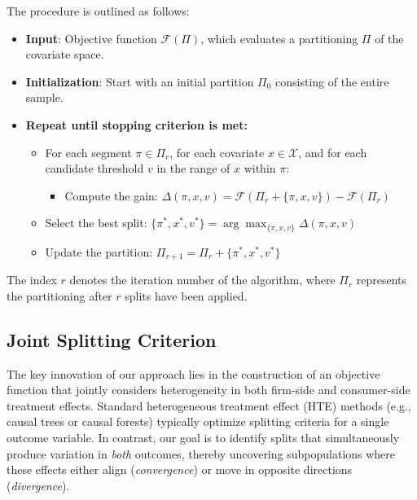 \documentclass[11pt,letterpaper,english]{article}
\theoremstyle{definition}
\theoremstyle{definition}
\begin{document}
\begin{bibunit}
The procedure is outlined as follows:

\begin{itemize}
    \item \textbf{Input}: Objective function $\mathcal{F}(\Pi)$, which evaluates a partitioning $\Pi$ of the covariate space.
    \item \textbf{Initialization}: Start with an initial partition $\Pi_0$ consisting of the entire sample.
    \item \textbf{Repeat until stopping criterion is met:}
    \begin{itemize}
        \item For each segment $\pi \in \Pi_r$, for each covariate $x \in \mathcal{X}$, and for each candidate threshold $v$ in the range of $x$ within $\pi$:
        \begin{itemize}[label={}]
            \item Compute the gain: \quad $\Delta(\pi, x, v) = \mathcal{F}(\Pi_r + \{\pi, x, v\}) - \mathcal{F}(\Pi_r)$
        \end{itemize}
        \item Select the best split: \quad $\{\pi^*, x^*, v^*\} = \arg\max_{\{\pi,x,v\}} \Delta(\pi, x, v)$
        \item Update the partition: \quad $\Pi_{r+1} = \Pi_r + \{\pi^*, x^*, v^*\}$
    \end{itemize}
\end{itemize}

The index \( r \) denotes the iteration number of the algorithm, where \( \Pi_r \) represents the partitioning after \( r \) splits have been applied.



\subsection{Joint Splitting Criterion}
\label{sec:spliting_criterion}

The key innovation of our approach lies in the construction of an objective function that jointly considers heterogeneity in both firm-side and consumer-side treatment effects. Standard heterogeneous treatment effect (HTE) methods (e.g., causal trees or causal forests) typically optimize splitting criteria for a single outcome variable. In contrast, our goal is to identify splits that simultaneously produce variation in \emph{both} outcomes, thereby uncovering subpopulations where these effects either align (\emph{convergence}) or move in opposite directions (\emph{divergence}).


\end{bibunit}
\end{document}
